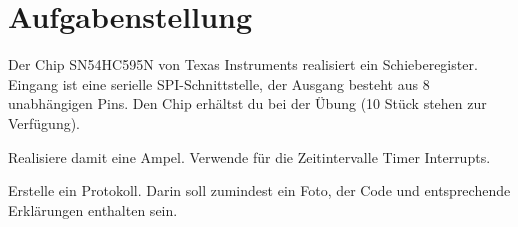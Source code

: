 
\section{Aufgabenstellung}
Der Chip SN54HC595N von Texas Instruments realisiert ein Schieberegister. Eingang ist eine serielle SPI-Schnittstelle, der Ausgang besteht aus 8 unabhängigen Pins. Den Chip erhältst du bei der Übung (10 Stück stehen zur Verfügung). 

Realisiere damit eine Ampel. Verwende für die Zeitintervalle Timer Interrupts.

Erstelle ein Protokoll. Darin soll zumindest ein Foto, der Code und entsprechende Erklärungen enthalten sein.
\clearpage
